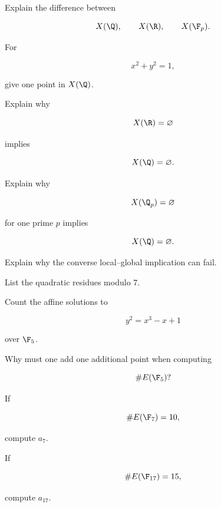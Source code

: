 \begin{exercise}[1]
Explain the difference between

\[ X(\Q),\qquad X(\R),\qquad X(\F_p). \]
\end{exercise}

\begin{exercise}[1]
For

\[ x^2+y^2=1, \]

give one point in \(X(\Q)\).
\end{exercise}

\begin{exercise}[2]
Explain why

\[ X(\R)=\varnothing \]

implies

\[ X(\Q)=\varnothing. \]
\end{exercise}

\begin{exercise}[2]
Explain why

\[ X(\Q_p)=\varnothing \]

for one prime \(p\) implies

\[ X(\Q)=\varnothing. \]
\end{exercise}

\begin{exercise}[2]
Explain why the converse local--global implication can fail.
\end{exercise}

\begin{exercise}[1]
List the quadratic residues modulo \(7\).
\end{exercise}

\begin{exercise}[2]
Count the affine solutions to

\[ y^2=x^3-x+1 \]

over \(\F_5\).
\end{exercise}

\begin{exercise}[2]
Why must one add one additional point when computing

\[ \#E(\F_5)? \]
\end{exercise}

\begin{exercise}[1]
If

\[ \#E(\F_7)=10, \]

compute \(a_7\).
\end{exercise}

\begin{exercise}[1]
If

\[ \#E(\F_{17})=15, \]

compute \(a_{17}\).
\end{exercise}

